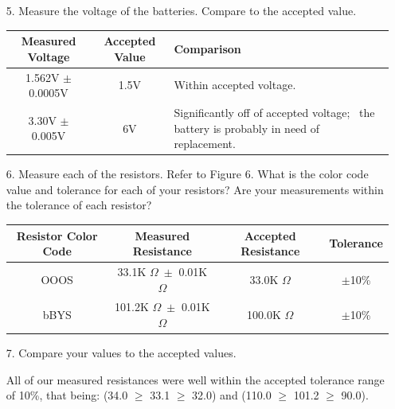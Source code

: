 \documentclass[12pt, letterpaper]{article}
\begin{document}
    \begin{enumerate}
        \item [5.] Measure the voltage of the batteries. Compare to the accepted value.
        
        \begin{mdframed}
            \begin{tabular}{|c|c|p{3in}|}
                \hline
                Measured Voltage & Accepted Value & Comparison  \\
                \hline
                1.562V $\pm$ 0.0005V & 1.5V & Within accepted voltage.  \\
                \hline
                3.30V $\pm$ 0.005V & 6V & Significantly off of accepted voltage; \ the battery is probably in need of replacement. \\
                \hline
            \end{tabular}
        \end{mdframed}

        \item[6.] Measure each of the resistors. Refer to Figure 6. What is the color code value and tolerance for each of your resistors? Are your measurements within the tolerance of each resistor?
        
        \begin{mdframed}
            \begin{center}
                \begin{tabular}{|c|c|c|c|}
                    \hline
                    Resistor Color Code & Measured Resistance & Accepted Resistance & Tolerance \\
                    \hline
                    OOOS & 33.1K $\Omega\; \pm$ 0.01K $\Omega$ & 33.0K $\Omega$ & $\pm$10\%     \\
                    \hline
                    bBYS & 101.2K $\Omega\; \pm$ 0.01K $\Omega$ & 100.0K $\Omega$ & $\pm$10\%   \\
                    \hline
                \end{tabular}    
            \end{center}
        \end{mdframed}

        \item[7.] Compare your values to the accepted values.
        
        \begin{mdframed}
            All of our measured resistances were well within the accepted tolerance range of 10\%, that being: (34.0 $\geq$ 33.1 $\geq$ 32.0) and (110.0 $\geq$ 101.2 $\geq$ 90.0).
        \end{mdframed}
    \end{enumerate}
\end{document}
